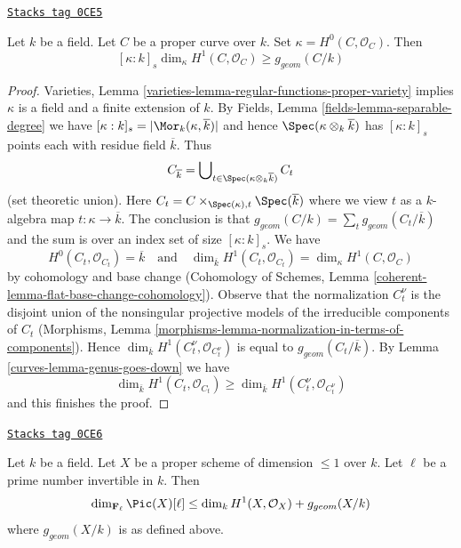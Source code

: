 \begin{lemma}
\label{curves-lemma-bound-geometric-genus-curve}
\href{https://stacks.math.columbia.edu/tag/0CE5}{\texttt{Stacks tag 0CE5}}

Let $k$ be a field. Let $C$ be a proper curve over $k$.
Set $\kappa = H^0(C, \mathcal{O}_C)$. Then
$$
[\kappa : k]_s \dim_\kappa H^1(C, \mathcal{O}_C) \geq g_{geom}(C/k)
$$
\end{lemma}

\begin{proof}

Varieties, Lemma \ref{varieties-lemma-regular-functions-proper-variety}
implies $\kappa$ is a field and a finite extension of $k$.
By Fields, Lemma \ref{fields-lemma-separable-degree}
we have $[\kappa : k]_s = |\Mor_k(\kappa, \overline{k})|$
and hence $\Spec(\kappa \otimes_k \overline{k})$ has
$[\kappa : k]_s$ points each with residue field $\overline{k}$.
Thus
$$
C_{\overline{k}} =
\bigcup\nolimits_{t \in \Spec(\kappa \otimes_k \overline{k})} C_t
$$
(set theoretic union). Here
$C_t = C \times_{\Spec(\kappa), t} \Spec(\overline{k})$ where
we view $t$ as a $k$-algebra map $t : \kappa \to \overline{k}$.
The conclusion is that $g_{geom}(C/k) = \sum_t g_{geom}(C_t/\overline{k})$
and the sum is over an index set of size $[\kappa : k]_s$.
We have
$$
H^0(C_t, \mathcal{O}_{C_t}) = \overline{k}
\quad\text{and}\quad
\dim_{\overline{k}} H^1(C_t, \mathcal{O}_{C_t}) =
\dim_\kappa H^1(C, \mathcal{O}_C)
$$
by cohomology and base change
(Cohomology of Schemes, Lemma \ref{coherent-lemma-flat-base-change-cohomology}).
Observe that the normalization $C_t^\nu$ is the disjoint
union of the nonsingular projective models of the
irreducible components of $C_t$
(Morphisms, Lemma \ref{morphisms-lemma-normalization-in-terms-of-components}).
Hence $\dim_{\overline{k}} H^1(C_t^\nu, \mathcal{O}_{C_t^\nu})$
is equal to $g_{geom}(C_t/\overline{k})$.
By Lemma \ref{curves-lemma-genus-goes-down} we have
$$
\dim_{\overline{k}} H^1(C_t, \mathcal{O}_{C_t}) \geq
\dim_{\overline{k}} H^1(C_t^\nu, \mathcal{O}_{C_t^\nu})
$$
and this finishes the proof.
\end{proof}

\begin{lemma}
\label{curves-lemma-bound-torsion-simple}
\href{https://stacks.math.columbia.edu/tag/0CE6}{\texttt{Stacks tag 0CE6}}

Let $k$ be a field. Let $X$ be a proper scheme of dimension $\leq 1$ over $k$.
Let $\ell$ be a prime number invertible in $k$. Then
$$
\dim_{\mathbf{F}_\ell} \Pic(X)[\ell] \leq
\dim_k H^1(X, \mathcal{O}_X) + g_{geom}(X/k)
$$
where $g_{geom}(X/k)$ is as defined above.
\end{lemma}

